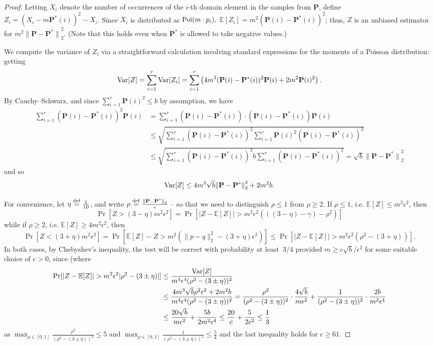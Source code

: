\documentclass[11pt]{article}
\theoremstyle{definition}
\newcommand{\E}{\mathbb{E}}
\newcommand{\p}{\mathbf{P}}
\newcommand{\eps}{\epsilon}
\newcommand{\norm}[1]{\lVert#1\rVert}
\newcommand{\Var}{\mathop{\textnormal{Var}}\nolimits}
\newcommand{\Poi}{\mathop{\textnormal{Poi}}\nolimits}
\newcommand{\eqdef}{\stackrel{{\mathrm {\footnotesize def}}}{=}}
\newcommand{\normtwo}[1]{{\norm{#1}}_2}
\begin{document}
\begin{proof}Letting $X_i$ denote the number of occurrences of the $i$-th domain element in the samples from $\p$, define $Z_i=(X_i-m\p^\ast(i))^2-X_i$. Since $X_i$ is distributed as $\Poi(m\cdot p_i),$  $\E[Z_i] = m^2(\p(i) - \p^\ast(i))^2$; thus, $Z$ is an unbiased estimator for $m^2\normtwo{ \p-\p^\ast }^2$. (Note that this holds even when $\p^\ast$ is allowed to take negative values.)

We compute the variance of $Z_i$ via a straightforward calculation involving standard expressions for the moments of a Poisson distribution: getting
\[
  \Var[Z]  = \sum_{i=1}^r \Var[Z_i] = \sum_{i=1}^r \left(4m^3(\p(i)-\p^\ast(i))^2 \p(i)  + 2m^2\p(i)^2\right).
\]
By Cauchy--Schwarz, and since $\sum_{i=1}^r \p(i)^2 \leq b$ by assumption, we have 
\begin{align*}
\sum_{i=1}^r (\p(i)-\p^\ast(i))^2 \p(i) &= \sum_{i=1}^r (\p(i)-\p^\ast(i))\cdot (\p(i)-\p^\ast(i)) \p(i)  \\
&\leq \sqrt{\sum_{i=1}^r (\p(i)-\p^\ast(i)) ^2 \sum_{i=1}^r \p(i)^2(\p(i)-\p^\ast(i))^2} \\
&\leq \sqrt{\sum_{i=1}^r (\p(i)-\p^\ast(i)) ^2 b \sum_{i=1}^r (\p(i)-\p^\ast(i)) ^2}
 = \sqrt{b} \normtwo{ \p-\p^\ast }^2
\end{align*}
and so 
 \[
 \Var[Z] \leq 4 m^3 \sqrt{b} \normtwo{ \p-\p^\ast }^2 + 2 m^2 b.
 \]
 
\noindent For convenience, let $\eta\eqdef\frac{1}{10}$, and write $\rho \eqdef \frac{\normtwo{ \p-\p^\ast }}{\eps}$ -- so that we need to distinguish $\rho \leq 1$ from $\rho \geq 2$. If $\rho \leq 1$, i.e. $\E[Z] \leq m^2\eps^2$, then 
 \[
    \Pr[ Z > (3-\eta)m^2\eps^2 ] = \Pr[ \lvert Z - \E[Z] \rvert > m^2\eps^2( ((3-\eta)-\gamma) - \rho^2 ) ]
 \]
 while if $\rho \geq 2$, i.e. $\E[Z] \geq 4m^2\eps^2$, then
 \[
    \Pr[ Z < (3+\eta)m^2\eps^2 ] = \Pr[ \E[Z] - Z > m^2( \lVert p-q\rVert_2^2 - (3+\eta)\eps^2 ) ] \leq \Pr[ \lvert Z - \E[Z] \rvert > m^2\eps^2( \rho^2 - (3+\eta) ) ].
 \]
In both cases, by Chebyshev's inequality, the test will be correct with probability at least~$3/4$ provided $m \geq c\sqrt{b}/\eps^2$ for some suitable choice of $c > 0$, since (where
\begin{align*}
    \Pr[ \lvert Z - \E[Z] \rvert > m^2\eps^2\lvert \rho^2 - (3\pm\eta) \rvert ] 
    &\leq \frac{\Var[Z]}{m^4\eps^4( \rho^2 - (3\pm\eta) )^2} \\
    &\leq \frac{ 4m^3 \sqrt{b} \rho^2\eps^2 + 2 m^2 b }{m^4\eps^4( \rho^2 - (3\pm\eta) )^2} 
    = \frac{\rho^2}{(\rho^2 - (3\pm\eta) )^2}\cdot\frac{ 4\sqrt{b}}{m\eps^2} + \frac{1}{(\rho^2 - (3\pm\eta) )^2}\cdot\frac{2 b }{m^2\eps^4} \\
    &\leq \frac{ 20\sqrt{b}}{m\eps^2} + \frac{5 b }{2m^2\eps^4}  \leq \frac{20}{c}+\frac{5}{2c^2} \leq \frac{1}{3}
\end{align*}
as $\max_{\rho\in[0,1]} \frac{\rho^2}{(\rho^2 - (3\pm\eta) )^2} \leq 5$ and $\max_{\rho\in[0,1]} \frac{1}{(\rho^2 - (3\pm\eta) )^2} \leq \frac{5}{4}$ and the last inequality holds for $c \geq 61$.
\end{proof}
\end{document}
